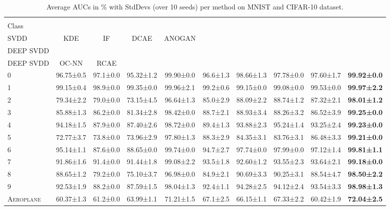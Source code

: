 \begin{table}[!t]
   \caption{Average AUCs in \% with StdDevs (over 10 seeds) per method on MNIST and CIFAR-10 dataset.}
   \label{tab:ocnn_results}
   \small %
   \centering %
   \begin{tabular}{lccccccccr} %
   \toprule[\heavyrulewidth]\toprule[\heavyrulewidth]
   \textsc{\pbox{20cm}{Normal \\ Class}} & \textsc{\pbox{20cm}{OCSVM / \\ SVDD}} & \textsc{KDE} &  \textsc{IF} & \textsc{DCAE} & \textsc{ANOGAN} & \textsc{\pbox{20cm}{SOFT-BOUND \\ DEEP SVDD}} & \textsc{\pbox{20cm}{ONE-CLASS \\ DEEP SVDD}} & \textsc{OC-NN} & \textsc{RCAE} \\
   \midrule
   0 & 96.75±0.5 & 97.1±0.0 & 95.32±1.2  & 99.90±0.0 & 96.6±1.3 & 98.66±1.3     & 97.78±0.0 & 97.60±1.7 &
   \bf{99.92±0.0}\\
   1 & 99.15±0.4 & 98.9±0.0 & 99.35±0.0  & 99.96±2.1 & 99.2±0.6 & 99.15±0.0     & 99.08±0.0 & \color[rgb]{0,0,1}99.53±0.0 & \bf{99.97±2.2}\\
   2 & 79.34±2.2 & 79.0±0.0 & 73.15±4.5  & 96.64±1.3 & 85.0±2.9 & 88.09±2.2     & 88.74±1.2 & 87.32±2.1 & \bf{98.01±1.2}\\
   3 & 85.88±1.3 & 86.2±0.0 & 81.34±2.8 & 98.42±0.0 &  88.7±2.1 &  88.93±3.4     & 88.26±3.2 & 86.52±3.9 & \bf{99.25±0.0}\\
   4 & 94.18±1.5 & 87.9±0.0 & 87.40±2.6  & 98.72±0.0 & 89.4±1.3 & 93.88±2.3     & 95.24±1.4 & 93.25±2.4 & \bf{99.23±0.0}\\
   5 & 72.77±3.7 & 73.8±0.0 & 73.96±2.9  & 97.80±1.3 & 88.3±2.9 & 84.35±3.1     & 83.76±3.1 & \color[rgb]{0,0,1}86.48±3.3 & \bf{99.21±0.0}\\
   6 & 95.14±1.1 & 87.6±0.0 & 88.65±0.0  & 99.74±0.0 & 94.7±2.7 & 97.74±0.0     & 97.99±0.0 & 97.12±1.4 & \bf{99.81±1.1}\\
   7 & 91.86±1.6 & 91.4±0.0 & 91.44±1.8  & 99.08±2.2 & 93.5±1.8 & 92.60±1.2     & 93.55±2.3 & 93.64±2.1 & \bf{99.18±0.0}\\
   8 & 88.65±1.2 & 79.2±0.0 & 75.10±3.7  & 96.98±0.0 & 84.9±2.1 & 90.69±3.3     & 90.25±3.1 & 88.54±4.7 & \bf{98.50±2.2}\\
   9 & 92.53±1.9 & 88.2±0.0 & 87.59±1.5  & 98.04±1.3 & 92.4±1.1 & 94.28±2.5     & 94.12±2.4 & 93.54±3.3 & \bf{98.98±1.3}\\
   \hline
  \textsc{Aeroplane}    & 60.37±1.3 & 61.2±0.0 & 63.99±1.1  &71.21±1.5& 67.1±2.5 & 66.15±1.1 & 67.33±2.2 & 60.42±1.9  & \bf{72.04±2.5}\\

\end{tabular}
\end{table}
